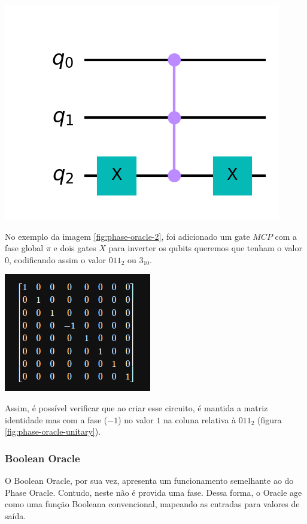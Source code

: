 \documentclass{article}
\begin{document}
\begin{center}
	\includegraphics[scale=0.3]{phase_oracle_2.png}
	\label{fig:phase-oracle-2}
\end{center}

No exemplo da imagem \ref{fig:phase-oracle-2}, foi adicionado um gate $MCP$ com a fase global $\pi$ e dois gates $X$ para inverter os qubits queremos que tenham o valor $0$, codificando assim o valor $011_{2}$ ou $3_{10}$.

\begin{center}
	\includegraphics[scale=0.5]{phase_oracle_unitary.png}
	\label{fig:phase-oracle-unitary}
\end{center}

Assim, é possível verificar que ao criar esse circuito, é mantida a matriz identidade mas com a fase ($-1$) no valor $1$ na coluna relativa à $011_{2}$ (figura \ref{fig:phase-oracle-unitary}). 


\subsubsection{Boolean Oracle}
O Boolean Oracle, por sua vez, apresenta um funcionamento semelhante ao do Phase Oracle. Contudo, neste não é provida uma fase. Dessa forma, o Oracle age como uma função Booleana convencional, mapeando as entradas para valores de saída.
\end{document}

